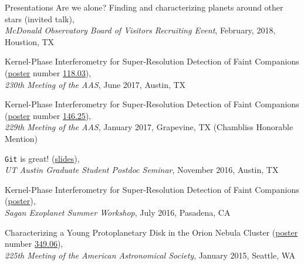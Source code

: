 \documentclass{resume} %
\begin{document}
\begin{rSection}{Presentations}
    Are we alone? Finding and characterizing planets around other stars (invited talk),\\\emph{McDonald Observatory Board of Visitors Recruiting Event}, February, 2018, Houstion, TX
    \vspace{-0.06cm}

    Kernel-Phase Interferometry for Super-Resolution Detection of Faint Companions (\href{http://smfactor.github.io/publications/AASposter.pdf}{poster} number \href{http://adsabs.harvard.edu/abs/2017AAS...23011803F}{118.03}),\\\emph{230th Meeting of the AAS}, June 2017, Austin, TX
    \vspace{-0.06cm}

    Kernel-Phase Interferometry for Super-Resolution Detection of Faint Companions (\href{http://smfactor.github.io/publications/AASposter.pdf}{poster} number \href{http://adsabs.harvard.edu/abs/2017AAS...22914625F}{146.25}),\\\emph{229th Meeting of the AAS}, January 2017, Grapevine, TX (Chambliss Honorable Mention)
    \vspace{-0.06cm}

    \texttt{Git} is great! (\href{https://ottostruve.github.io/gsps/slides/factor_git.pdf}{slides}),\\{\em UT Austin Graduate Student Postdoc Seminar}, November 2016, Austin, TX
    \vspace{-0.06cm}

    Kernel-Phase Interferometry for Super-Resolution Detection of Faint Companions (\href{http://smfactor.github.io/publications/SSWposter.pdf}{poster}),\\\emph{Sagan Exoplanet Summer Workshop}, July 2016, Pasadena, CA
    \vspace{-0.06cm}


    Characterizing a Young Protoplanetary Disk in the Orion Nebula Cluster (\href{http://smfactor.github.io/publications/WesPoster.pdf}{poster} number \href{http://adsabs.harvard.edu/abs/2015AAS...22534906F}{349.06}),\\\emph{225th Meeting of the American Astronomical Society}, January 2015, Seattle, WA
    \vspace{-0.06cm}

\end{rSection}
\end{document}
